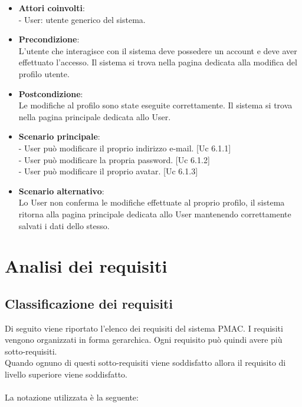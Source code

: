 \documentclass[10pt,a4paper]{article}
\begin{document}
\begin{itemize}
\item \textbf{Attori coinvolti}:\\
- User: utente generico del sistema.

\item \textbf{Precondizione}:\\
L'utente che interagisce con il sistema deve possedere un account e deve aver effettuato l'accesso. Il sistema si trova nella pagina dedicata alla modifica del profilo utente.

\item \textbf{Postcondizione}:\\
Le modifiche al profilo sono state eseguite correttamente. Il sistema si trova nella pagina principale dedicata allo User.

\item \textbf{Scenario principale}:\\
- User può modificare il proprio indirizzo e-mail. [Uc 6.1.1]\\
- User può modificare la propria password. [Uc 6.1.2]\\
- User può modificare il proprio avatar. [Uc 6.1.3]

\item \textbf{Scenario alternativo}:\\
Lo User non conferma le modifiche effettuate al proprio profilo, il sistema ritorna alla pagina principale dedicata allo User mantenendo correttamente salvati i dati dello stesso.

\end{itemize}




\newpage

\section{Analisi dei requisiti}

\thispagestyle{fancy}

\subsection{Classificazione dei requisiti}
Di seguito viene riportato l'elenco dei requisiti del sistema PMAC.
I requisiti vengono organizzati in forma gerarchica. Ogni requisito può quindi avere più sotto-requisiti.\\
Quando ognuno di questi sotto-requisiti viene soddisfatto allora il requisito di livello superiore viene soddisfatto.\\
\\
La notazione utilizzata è la seguente:\\
	
\end{document}

